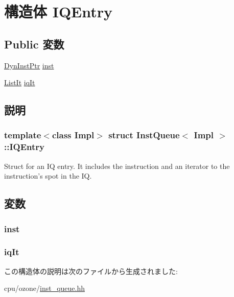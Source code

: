 \hypertarget{structInstQueue_1_1IQEntry}{
\section{構造体 IQEntry}
\label{structInstQueue_1_1IQEntry}
}
\subsection*{Public 変数}
\begin{DoxyCompactItemize}
\item 
\hyperlink{classInstQueue_a028ce10889c5f6450239d9e9a7347976}{DynInstPtr} \hyperlink{structInstQueue_1_1IQEntry_af5d4fb974eeb4507d4c837d365d0cefc}{inst}
\item 
\hyperlink{classInstQueue_a184cb829e22cc656acb41864f68f51ea}{ListIt} \hyperlink{structInstQueue_1_1IQEntry_a0deec4d5d0af5df075f848b721260166}{iqIt}
\end{DoxyCompactItemize}


\subsection{説明}
\subsubsection*{template$<$class Impl$>$ struct InstQueue$<$ Impl $>$::IQEntry}

Struct for an IQ entry. It includes the instruction and an iterator to the instruction's spot in the IQ. 

\subsection{変数}
\hypertarget{structInstQueue_1_1IQEntry_af5d4fb974eeb4507d4c837d365d0cefc}{
\subsubsection[{inst}]{ {\bf inst}}}
\label{structInstQueue_1_1IQEntry_af5d4fb974eeb4507d4c837d365d0cefc}
\hypertarget{structInstQueue_1_1IQEntry_a0deec4d5d0af5df075f848b721260166}{
\subsubsection[{iqIt}]{ {\bf iqIt}}}
\label{structInstQueue_1_1IQEntry_a0deec4d5d0af5df075f848b721260166}


この構造体の説明は次のファイルから生成されました:\begin{DoxyCompactItemize}
\item 
cpu/ozone/\hyperlink{ozone_2inst__queue_8hh}{inst\_\-queue.hh}\end{DoxyCompactItemize}
